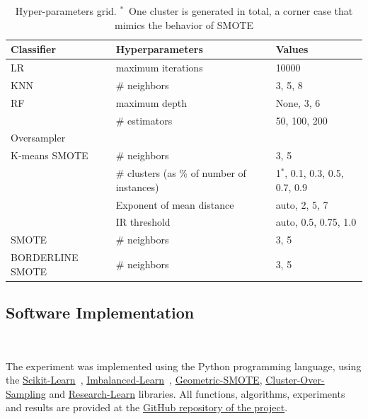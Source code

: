 \begin{table}
	\centering
    \begin{tabular}{lll}
		\toprule
		Classifier       & Hyperparameters      & Values                            \\
		\midrule
		LR               & maximum iterations   & 10000                             \\
		KNN              & \# neighbors  & {3, 5, 8}                            \\
		RF               & maximum depth        & {None, 3, 6}                      \\
		                 & \# estimators & {50, 100, 200}                         \\
		\toprule
		Oversampler      &                      &                                   \\
		\midrule
        K-means SMOTE    & \# neighbors  & {3, 5}                            \\
		                 & \# clusters (as \% of number of instances)   & {1$^*$, 0.1, 0.3, 0.5, 0.7, 0.9}      \\
                         & Exponent of mean distance & {auto, 2, 5, 7}       \\
                         & IR threshold  & {auto, 0.5, 0.75, 1.0}            \\
		SMOTE            & \# neighbors  & {3, 5}                            \\
		BORDERLINE SMOTE & \# neighbors  & {3, 5}                            \\
		\bottomrule
	\end{tabular}
    \caption[Hyper-parameters grid.]{Hyper-parameters grid. $^*$~One cluster is generated in total, a
    corner case that mimics the behavior of SMOTE
    }\label{tab:grid_kmeans}
\end{table}

\subsection{Software Implementation}~\label{sec:implementation-kmeans}

The experiment was implemented using the Python programming language, using the
\href{https://scikit-learn.org/stable/}{Scikit-Learn}~\cite{Pedregosa2011},
\href{https://imbalanced-learn.org/en/stable/}{Imbalanced-Learn}~\cite{JMLR:v18:16-365},
\href{https://geometric-smote.readthedocs.io/en/latest/?badge=latest}{Geometric-SMOTE},
\href{https://cluster-over-sampling.readthedocs.io/en/latest/?badge=latest}{Cluster-Over-Sampling}
and \href{https://research-learn.readthedocs.io/en/latest/?badge=latest}{Research-Learn} libraries.
All functions, algorithms, experiments and results are provided at the
\href{https://github.com/joaopfonseca/publications}{GitHub
repository of the project}.

